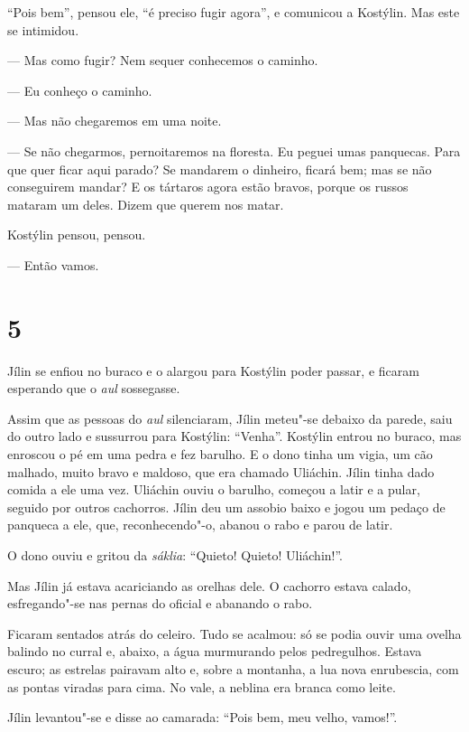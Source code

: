 ``Pois bem'', pensou ele, ``é preciso fugir agora'', e comunicou a
Kostýlin. Mas este se intimidou.

--- Mas como fugir? Nem sequer conhecemos o caminho.

--- Eu conheço o caminho.

--- Mas não chegaremos em uma noite.

--- Se não chegarmos, pernoitaremos na floresta. Eu peguei umas
panquecas. Para que quer ficar aqui parado? Se mandarem o dinheiro,
ficará bem; mas se não conseguirem mandar? E os tártaros agora estão
bravos, porque os russos mataram um deles. Dizem que querem nos matar.

Kostýlin pensou, pensou.

--- Então vamos.

\section{5}

Jílin se enfiou no buraco e o alargou para Kostýlin poder passar, e
ficaram esperando que o \emph{aul} sossegasse.

Assim que as pessoas do \emph{aul} silenciaram, Jílin meteu"-se debaixo
da parede, saiu do outro lado e sussurrou para Kostýlin: ``Venha''.
Kostýlin entrou no buraco, mas enroscou o pé em uma pedra e fez barulho.
E o dono tinha um vigia, um cão malhado, muito bravo e maldoso, que era
chamado Uliáchin. Jílin tinha dado comida a ele uma vez. Uliáchin ouviu
o barulho, começou a latir e a pular, seguido por outros cachorros.
Jílin deu um assobio baixo e jogou um pedaço de panqueca a ele, que, reconhecendo"-o, abanou o rabo e parou de latir.

O dono ouviu e gritou da \emph{sáklia}: ``Quieto! Quieto! Uliáchin!''.

Mas Jílin já estava acariciando as orelhas dele. O cachorro
estava calado, esfregando"-se nas pernas do oficial e abanando o rabo.

Ficaram sentados atrás do celeiro. Tudo se acalmou: só se podia ouvir uma
ovelha balindo no curral e, abaixo, a água murmurando pelos pedregulhos.
Estava escuro; as estrelas pairavam alto e, sobre a montanha, a lua nova
enrubescia, com as pontas viradas para cima. No vale, a neblina era
branca como leite.

Jílin levantou"-se e disse ao camarada: ``Pois bem, meu velho, vamos!''.


